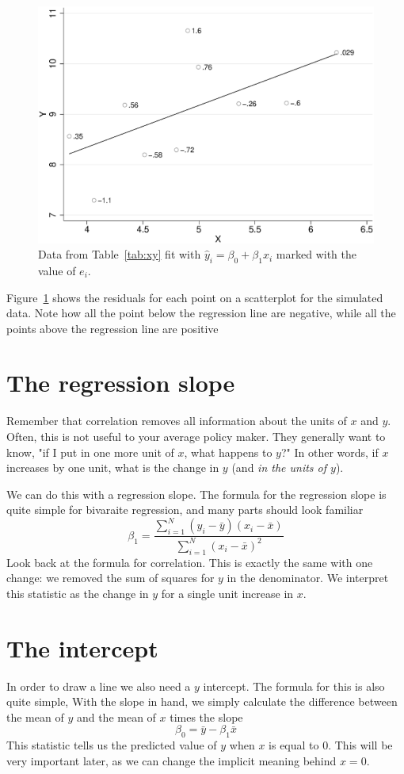 \begin{figure}
   \centering
   \includegraphics[angle=0,
           width=.75\textwidth]{efit.eps}
   \caption{Data from Table~\ref{tab:xy} fit with $\hat{y}_i=\beta_0+\beta_1x_i$ marked with the value of $e_i$.}
  \label{fig:efit}
\end{figure}
Figure~\ref{fig:efit} shows the residuals for each point on a scatterplot for the simulated data. Note how all the point below the regression line are negative, while all the points above the regression line are positive
\section{The regression slope}
Remember that correlation removes all information about the units of $x$ and $y$. Often, this is not useful to your average policy maker. They generally want to know, "if I put in one more unit of $x$, what happens to $y$?" In other words, if $x$ increases by one unit, what is the change in $y$ (and {\it in the units of $y$}).

We can do this with a regression slope. The formula for the regression slope is quite simple for bivaraite regression, and many parts should look familiar
\begin{equation}\label{eq:olsslope}
\beta_1=\frac{\sum_{i=1}^N\left(y_i-\bar{y}\right)\left(x_i-\bar{x}\right)}{\sum_{i=1}^N\left(x_i-\bar{x}\right)^2}
\end{equation}
Look back at the formula for correlation. This is exactly the same with one change: we removed the sum of squares for $y$ in the denominator. We interpret this statistic as the change in $y$ for a single unit increase in $x$.
\section{The intercept}
In order to draw a line we also need a $y$ intercept. The formula for this is also quite simple, With the slope in hand, we simply calculate the difference between the mean of $y$ and the mean of $x$ times the slope
\begin{equation}\label{eq:olsintercept}
\beta_0=\bar{y}-\beta_1\bar{x}
\end{equation}
This statistic tells us the predicted value of $y$ when $x$ is equal to 0. This will be very important later, as we can change the implicit meaning behind $x = 0$.
